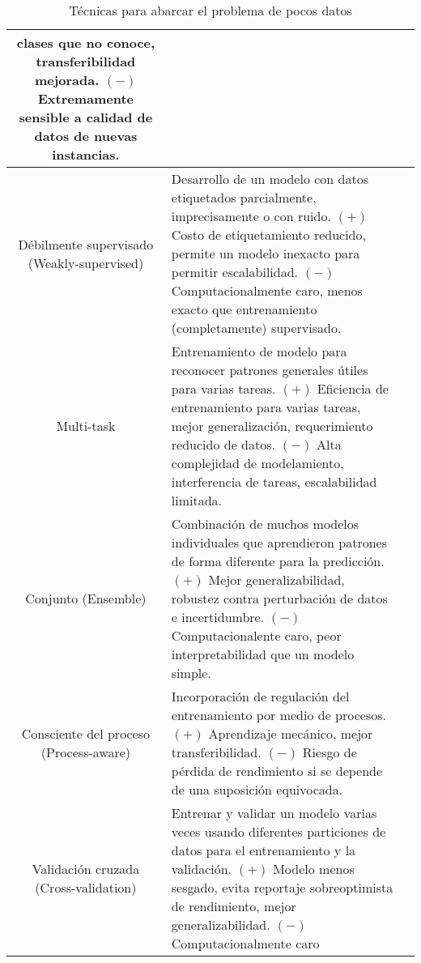 \begin{center}
\begin{table}[ht!]
\begin{tabular}{ |c|m{9.5cm}|c| }
            clases que no conoce, transferibilidad mejorada. $(-)$ Extremamente sensible a calidad de datos de nuevas
            instancias. & \autocite{safonova-2023} \\
            \hline
            \makecell{Débilmente supervisado \\ (Weakly-supervised)} & Desarrollo de un modelo con datos etiquetados
            parcialmente, imprecisamente o con ruido. $(+)$ Costo de etiquetamiento reducido, permite un modelo
            inexacto para permitir escalabilidad. $(-)$ Computacionalmente caro, menos exacto que entrenamiento
            (completamente) supervisado. & \autocite{safonova-2023} \\
            \hline
            Multi-task & Entrenamiento de modelo para reconocer patrones generales útiles para varias tareas. $(+)$
            Eficiencia de entrenamiento para varias tareas, mejor generalización, requerimiento reducido de datos.
            $(-)$ Alta complejidad de modelamiento, interferencia de tareas, escalabilidad limitada. &
            \autocite{safonova-2023} \\
            \hline
            Conjunto (Ensemble) & Combinación de muchos modelos individuales que aprendieron patrones de forma
            diferente para la predicción. $(+)$ Mejor generalizabilidad, robustez contra perturbación de datos e
            incertidumbre. $(-)$ Computacionalente caro, peor interpretabilidad que un modelo simple. &
            \autocite{safonova-2023,langkvist-2016,pritt-2018} \\
            \hline
            \makecell{Consciente del proceso \\ (Process-aware)} & Incorporación de regulación del entrenamiento por
            medio de procesos. $(+)$ Aprendizaje mecánico, mejor transferibilidad. $(-)$ Riesgo de pérdida de
            rendimiento si se depende de una suposición equivocada. & \autocite{safonova-2023} \\
            \hline
            \makecell{Validación cruzada \\ (Cross-validation)} & Entrenar y validar un modelo varias veces usando
            diferentes particiones de datos para el entrenamiento y la validación. $(+)$ Modelo menos sesgado, evita
            reportaje sobreoptimista de rendimiento, mejor generalizabilidad. $(-)$ Computacionalmente caro &
            \autocite{safonova-2023} \\
            \hline
        \end{tabular}
        \caption{Técnicas para abarcar el problema de pocos datos}
        \label{table:3}
    \end{table}
\end{center}
